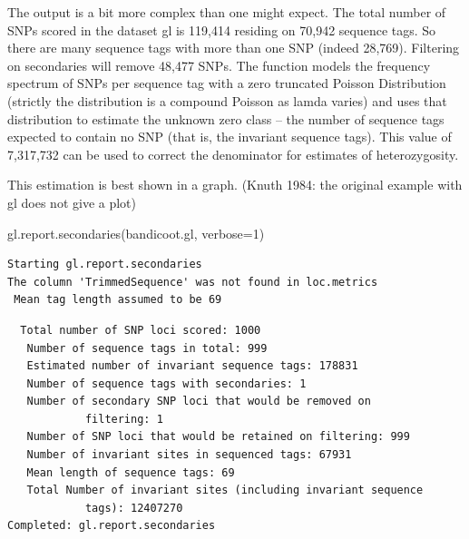 \documentclass[
  letterpaper,
  DIV=11,
  numbers=noendperiod]{scrreprt}
\newenvironment{Shaded}{\begin{snugshade}}{\end{snugshade}}
\newcommand{\AttributeTok}[1]{\textcolor[rgb]{0.49,0.56,0.16}{#1}}
\newcommand{\DecValTok}[1]{\textcolor[rgb]{0.25,0.63,0.44}{#1}}
\newcommand{\FunctionTok}[1]{\textcolor[rgb]{0.02,0.16,0.49}{#1}}
\newcommand{\NormalTok}[1]{\textcolor[rgb]{0.00,0.44,0.13}{#1}}
\let\textttOrig\texttt
\renewcommand{\texttt}[1]{\textttOrig{\color{blue}{#1}}}
\begin{document}
The output is a bit more complex than one might expect. The total number
of SNPs scored in the dataset gl is 119,414 residing on 70,942 sequence
tags. So there are many sequence tags with more than one SNP (indeed
28,769). Filtering on secondaries will remove 48,477 SNPs. The function
models the frequency spectrum of SNPs per sequence tag with a zero
truncated Poisson Distribution (strictly the distribution is a compound
Poisson as lamda varies) and uses that distribution to estimate the
unknown zero class -- the number of sequence tags expected to contain no
SNP (that is, the invariant sequence tags). This value of 7,317,732 can
be used to correct the denominator for estimates of heterozygosity.

This estimation is best shown in a graph. (Knuth 1984: the original
example with gl does not give a plot)

\begin{Shaded}
\begin{Highlighting}[]
\FunctionTok{gl.report.secondaries}\NormalTok{(bandicoot.gl, }\AttributeTok{verbose=}\DecValTok{1}\NormalTok{)}
\end{Highlighting}
\end{Shaded}

\begin{verbatim}
Starting gl.report.secondaries 
The column 'TrimmedSequence' was not found in loc.metrics
 Mean tag length assumed to be 69 
\end{verbatim}

\begin{figure}[H]

{\centering \texttt{[image: basicfiltering\_files/figure-pdf/unnamed-chunk-11-1.pdf]}

}

\end{figure}

\begin{verbatim}
  Total number of SNP loci scored: 1000 
   Number of sequence tags in total: 999 
   Estimated number of invariant sequence tags: 178831 
   Number of sequence tags with secondaries: 1 
   Number of secondary SNP loci that would be removed on 
            filtering: 1 
   Number of SNP loci that would be retained on filtering: 999 
   Number of invariant sites in sequenced tags: 67931 
   Mean length of sequence tags: 69 
   Total Number of invariant sites (including invariant sequence 
            tags): 12407270 
Completed: gl.report.secondaries 
\end{verbatim}
\end{document}
